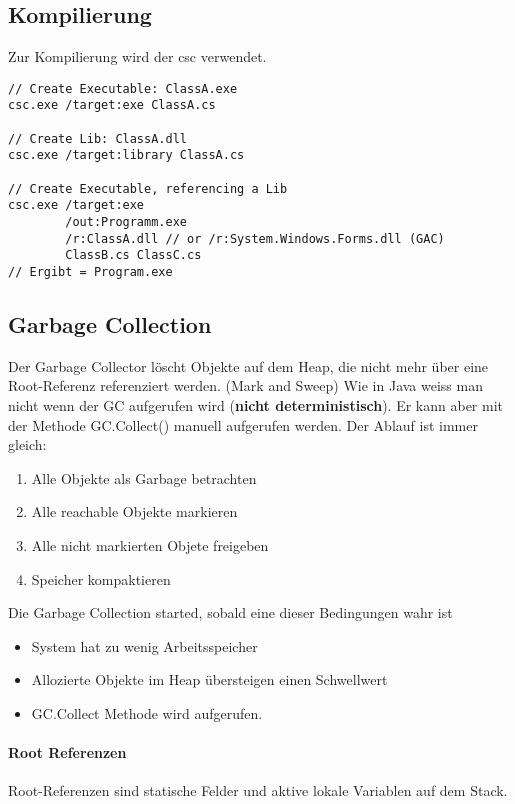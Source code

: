 \clearpage

\subsection{Kompilierung}
Zur Kompilierung wird der \gls{csc} verwendet.  
\begin{lstlisting}
// Create Executable: ClassA.exe
csc.exe /target:exe ClassA.cs

// Create Lib: ClassA.dll
csc.exe /target:library ClassA.cs

// Create Executable, referencing a Lib
csc.exe /target:exe
		/out:Programm.exe
		/r:ClassA.dll // or /r:System.Windows.Forms.dll (GAC)
		ClassB.cs ClassC.cs
// Ergibt = Program.exe
\end{lstlisting}

\subsection{Garbage Collection}
Der Garbage Collector löscht Objekte auf dem Heap, die nicht mehr über eine Root-Referenz referenziert werden. (Mark and Sweep) Wie in Java weiss man nicht wenn der GC aufgerufen wird (\textbf{nicht deterministisch}). Er kann aber mit der Methode GC.Collect() manuell aufgerufen werden. Der Ablauf ist immer gleich:
\begin{enumerate}
	\item Alle Objekte als Garbage betrachten
	\item Alle reachable Objekte markieren
	\item Alle nicht markierten Objete freigeben
	\item Speicher kompaktieren
\end{enumerate}

Die Garbage Collection started, sobald eine dieser Bedingungen wahr ist
\begin{itemize}
	\item System hat zu wenig Arbeitsspeicher
	\item Allozierte Objekte im Heap übersteigen einen Schwellwert
	\item GC.Collect Methode wird aufgerufen.
\end{itemize}

\paragraph{Root Referenzen}
Root-Referenzen sind statische Felder und aktive lokale Variablen auf dem Stack.

